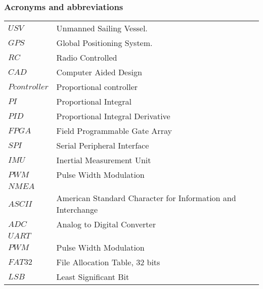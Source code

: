 \subsubsection*{Acronyms and abbreviations}

\begingroup
\renewcommand{\arraystretch}{1.2}
\begin{tabular}{@{}p{2.5cm} l}
    $USV$ & Unmanned Sailing Vessel. \\
    $GPS$ & Global Positioning System. \\
    $RC$ & Radio Controlled \\
    $CAD$ & Computer Aided Design \\
    $P controller$ & Proportional controller \\
    $PI$ & Proportional Integral \\
    $PID$ & Proportional Integral Derivative \\
    $FPGA$ & Field Programmable Gate Array \\
    $SPI$ & Serial Peripheral Interface \\
    $IMU$ & Inertial Measurement Unit \\
    $PWM$ & Pulse Width Modulation \\
    $NMEA$ & \\
    $ASCII$ & American Standard Character for Information and Interchange \\
    $ADC$ & Analog to Digital Converter \\
    $UART$ & \\
    $PWM$ & Pulse Width Modulation \\   
    $FAT32$ & File Allocation Table, 32 bits \\
    $LSB$ & Least Significant Bit \\

\end{tabular}
